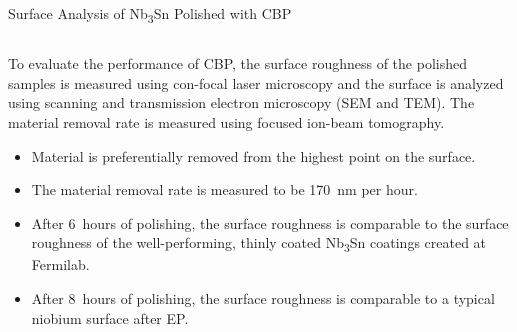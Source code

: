 \documentclass{beamer}
\begin{document}
\begin{frame}{}
\begin{columns}[t]
\begin{column}{0.32\linewidth}
\begin{block}{\label{sec:samplestudy}Surface Analysis of Nb\textsubscript{3}Sn Polished with CBP}
\begin{columns}[t]
                    \end{columns}
                    To evaluate the performance of CBP, the surface roughness of the polished samples is measured using con-focal laser microscopy and the surface is analyzed using scanning and transmission electron microscopy (SEM and TEM). The material removal rate is measured using focused ion-beam tomography.
                    \begin{itemize}                        
                        \item Material is preferentially removed from the highest point on the surface.
                        \item The material removal rate is measured to be 170~nm per hour.
                        \item After 6~hours of polishing, the surface roughness is comparable to the surface roughness of the well-performing, thinly coated Nb\textsubscript{3}Sn coatings created at Fermilab\cite{posen2021advances}.
                        \item After 8~hours of polishing, the surface roughness is comparable to a typical niobium surface after EP.
                    \end{itemize}
                \end{block}
            \end{column}






\end{columns}
\end{frame}
\end{document}
